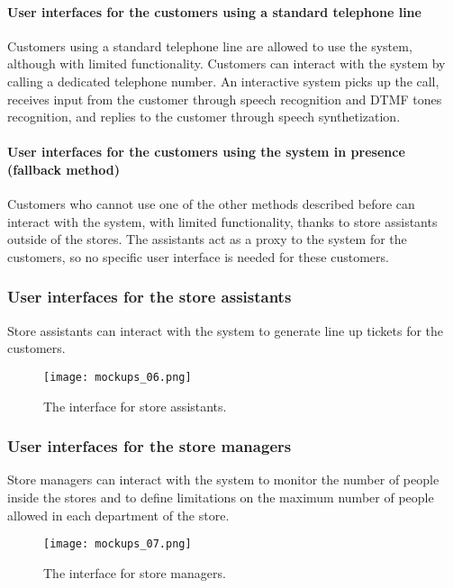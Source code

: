 \documentclass[../../main.tex]{subfiles}
\begin{document}
  \pagebreak

  \paragraph{User interfaces for the customers using a standard telephone line}

  Customers using a standard telephone line are allowed to use the system,
  although with limited functionality. Customers can interact with the system by
  calling a dedicated telephone number. An interactive system picks up the call,
  receives input from the customer through speech recognition and DTMF tones
  recognition, and replies to the customer through speech synthetization.

  \paragraph{User interfaces for the customers using the system in presence (fallback method)}

  Customers who cannot use one of the other methods described before can
  interact with the system, with limited functionality, thanks to store
  assistants outside of the stores. The assistants act as a proxy to the system
  for the customers, so no specific user interface is needed for these
  customers.

  \subsubsection{User interfaces for the store assistants}

  Store assistants can interact with the system to generate line up tickets for
  the customers.

  \begin{figure}[H]
    \centering
    \texttt{[image: mockups\_06.png]}
    \caption{The interface for store assistants.}
  \end{figure}

  \subsubsection{User interfaces for the store managers}

  Store managers can interact with the system to monitor the number of people
  inside the stores and to define limitations on the maximum number of people
  allowed in each department of the store.

  \begin{figure}[H]
    \centering
    \texttt{[image: mockups\_07.png]}
    \caption{The interface for store managers.}
  \end{figure}
\end{document}
